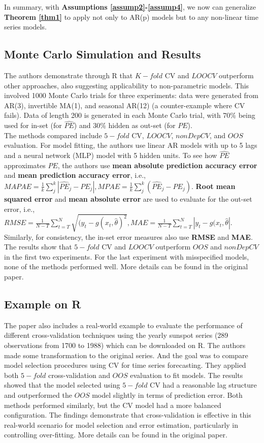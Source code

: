 \documentclass[12pt, oneside]{amsart}
\theoremstyle{definition}
\theoremstyle{remark}
\numberwithin{equation}{section}
\begin{document}
In summary, with \textbf{Assumptions \ref{assump2}-\ref{assump4}}, we now can generalize \textbf{Theorem \ref{thm1}} to apply not only to AR(p) models but to any non-linear time series models.


\subsection{Monte Carlo Simulation and Results}
The authors demonstrate through R that $K-fold$ CV and $LOOCV$ outperform other approaches, also suggesting applicability to non-parametric models. This involved 1000 Monte Carlo trials for three experiments: data were generated from AR(3), invertible MA(1), and seasonal AR(12) (a counter-example where CV fails). Data of length 200 is generated in each Monte Carlo trial, with 70\% being used for in-set (for $\hat{PE}$) and 30\% hidden as out-set (for $PE$).\\

The methods compared include $5-fold$ CV, $LOOCV$, $nonDepCV$, and $OOS$ evaluation. For model fitting, the authors use linear AR models with up to 5 lags and a neural network (MLP) model with 5 hidden units.
To see how $\hat{PE}$ approximates $PE$, the authors use \textbf{mean absolute prediction accuracy error} and \textbf{mean prediction accuracy error}, i.e., $MAPAE = \frac{1}{k} \sum_j^k | \hat{PE}_j - PE_j|, MPAE = \frac{1}{k} \sum_j^k ( \hat{PE}_j - PE_j)$.
\textbf{Root mean squared error} and \textbf{mean absolute error} are used to evaluate for the out-set error, i.e., $RMSE = \frac{1}{N-T} \sum_{t=T}^N \sqrt{(y_t - g(x_t, \hat{\theta})^2}, MAE = \frac{1}{N-T} \sum_{t=T}^N |y_t - g(x_t, \hat{\theta}|$. Similarly, for consistency, the in-set error measures also use \textbf{RMSE} and \textbf{MAE}.\\

The results show that $5-fold$ CV and $LOOCV$ outperform $OOS$ and $nonDepCV$ in the first two experiments. For the last experiment with misspecified models, none of the methods performed well. More details can be found in the original paper.

\subsection{Example on R}
The paper also includes a real-world example to evaluate the performance of different cross-validation techniques using the yearly sunspot series (289 observations from 1700 to 1988) which can be downloaded on R. The authors made some transformation to the original series. And the goal was to compare model selection procedures using CV for time series forecasting. They applied both $5-fold$ cross-validation and $OOS$ evaluation to fit models. The results showed that the model selected using $5-fold$ CV had a reasonable lag structure and outperformed the $OOS$ model slightly in terms of prediction error. Both methods performed similarly, but the CV model had a more balanced configuration. The findings demonstrate that cross-validation is effective in this real-world scenario for model selection and error estimation, particularly in controlling over-fitting. More details can be found in the original paper.
\end{document}
